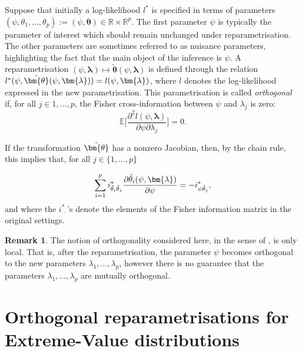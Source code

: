 \documentclass{article}
\newcommand{\mb}{\mathbb}
\newcommand{\1}{\mathds{1}}
\theoremstyle{definition}
\newtheorem{remark}{Remark}[section]
\begin{document}
Suppose that initially a log-likelihood $l^*$ is specified in terms of parameters $(\psi,\theta_1,...,\theta_p):=(\psi,\bm{\theta}) \in \mb{R}\times\mb{R}^p$. The first parameter $\psi$ is typically the parameter of interest which should remain unchanged under reparametrisation. The other parameters are sometimes referred to as nuisance parameters, highlighting the fact that the main object of the inference is $\psi$. 
A reparametrisation $(\psi,\bm{\lambda}) \mapsto \tilde{\bm{\theta}}(\psi,\bm{\lambda})$ is defined through the relation $l^*(\psi,\Tilde{\bm{\theta}}(\psi,\bm{\lambda})) = l(\psi,\bm{\lambda})$, where $l$ denotes the log-likelihood expressed in the new parametrisation. This parametrisation is called \textit{orthogonal} if, for all $j\in{1,...,p}$, the Fisher cross-information between $\psi$ and $\lambda_j$ is zero:
\begin{equation*}
\mb{E}\bigg[\frac{\partial^2l(\psi,\bm{\lambda})}{\partial \psi \partial \lambda_j}\bigg] = 0.
\end{equation*}





\noindent If the transformation $\Tilde{\bm{\theta}}$ has a nonzero Jacobian, then, by the chain rule, this implies that, for all $j \in \{1,...,p\}$

\begin{equation}\label{eq:orthogonal_pde}
    \sum_{i=1}^p i^*_{\Tilde{\theta}_i\Tilde{\theta}_j} \frac{\partial\Tilde{\theta}_i(\psi, \bm{\lambda})}{\partial\psi} = - i^*_{\psi\Tilde{\theta}_j},
\end{equation}
 and where the $i_{\cdot\cdot}^*$'s denote the elements of the Fisher information matrix in the original settings.

\begin{remark}
    The notion of orthogonality considered here, in the sense of \citet{cox1987parameter}, is only local. That is, after the reparametrisation, the parameter $\psi$ becomes orthogonal to the new parameters $\lambda_1,\ldots,\lambda_p$, however there is no guarantee that the parameters $\lambda_1,\ldots,\lambda_p$ are mutually orthogonal.
\end{remark}

\section{Orthogonal reparametrisations for Extreme-Value distributions}\label{sec:main}
\end{document}
